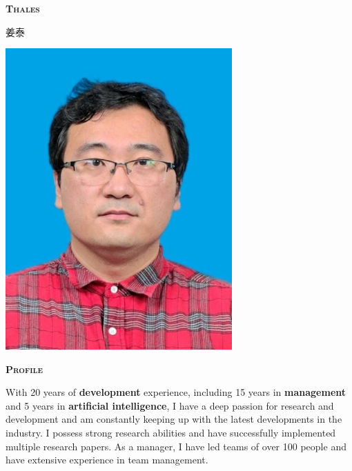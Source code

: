 \documentclass[11pt, a4paper]{article}
\newcommand{\headleft}[1]{\vspace*{3ex}\textsc{\textbf{#1}}\par%
    \vspace*{-1.5ex}\hrulefill\par\vspace*{0.7ex}}
\begin{document}
\setlength{\topskip}{0pt}
\setlength{\parindent}{0pt}
\setlength{\parskip}{0pt}
\setlength{\fboxsep}{0pt}
\pagestyle{empty}
\raggedbottom

\begin{minipage}[t]{0.33\textwidth} %
\colorbox{cvblue}{\begin{minipage}[t][5mm][t]{\textwidth}\null\hfill\null\end{minipage}}

\vspace{-.2ex} %
\colorbox{cvblue!90}{\color{white}  %
\textwidth\relax%
\begin{minipage}[t][293mm][t]{0.82\textwidth}
\raggedright
\vspace*{2.5ex}

\Large \textbf{ \textsc{Thales}} \begin{CJK}{UTF8}{gbsn}
    姜泰
\end{CJK} \normalsize 

\null\hfill\includegraphics[width=0.65\textwidth]{./assets/thales.jpg}\hfill\null

\vspace*{0.5ex} %

\headleft{Profile}
With 20 years of \textbf{development} experience, including 15 years in \textbf{management} and 5 years in \textbf{artificial intelligence}, I have a deep passion for research and development and am constantly keeping up with the latest developments in the industry. I possess strong research abilities and have successfully implemented multiple research papers. As a manager, I have led teams of over 100 people and have extensive experience in team management.


\end{minipage}}
\end{minipage}
\end{document}
